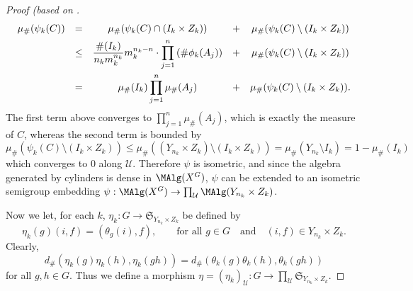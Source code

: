\begin{proof}[Proof (based on \cite{ozawasoficnotes}]
\[\begin{array}{rcccc}
\mu_\#(\psi_k(C))&=&\mu_\#(\psi_k(C)\cap(I_k\times Z_k))&+&\mu_\#(\psi_k(C)\setminus(I_k\times Z_k))\vspace{1ex}\\
&\leq&\displaystyle{\frac{\#(I_k)}{n_km_k^{n_k}}m_k^{n_k-n}\cdot\prod_{j=1}^n\left(\#\phi_k(A_j)\right)}&+&\displaystyle{\mu_\#(\psi_k(C)\setminus(I_k\times Z_k))}\vspace{1ex}\\
&=&\displaystyle{\mu_\#(I_k)\prod_{j=1}^n\mu_\#(A_j)}&+&\displaystyle{\mu_\#(\psi_k(C)\setminus(I_k\times Z_k)).}
\end{array}\]
The first term above converges to $\prod_{j=1}^n\mu_{\#}(A_j)$, which is exactly the measure of $C$, whereas the second term is bounded by
\[\mu_\#(\psi_k(C)\setminus(I_k\times Z_k))\leq\mu_\#((Y_{n_k}\times Z_k)\setminus(I_k\times Z_k))=\mu_\#(Y_{n_k}\setminus I_k)=1-\mu_\#(I_k)\]
which converges to $0$ along $\mathcal{U}$. Therefore $\psi$ is isometric, and since the algebra generated by cylinders is dense in $\MAlg(X^G)$, $\psi$ can be extended to an isometric semigroup embedding $\psi:\MAlg(X^G)\to\prod_{\mathcal{U}}\MAlg(Y_{n_k}\times Z_k)$.

Now we let, for each $k$, $\eta_k:G\to\mathfrak{S}_{Y_{n_k}\times Z_k}$ be defined by
\[\eta_k(g)(i,f)=(\theta_g(i),f),\qquad\text{for all }g\in G\quad\text{and}\quad(i,f)\in Y_{n_k}\times Z_k.\]
Clearly,
\[d_\#(\eta_k(g)\eta_k(h),\eta_k(gh))=d_{\#}(\theta_k(g)\theta_k(h),\theta_k(gh))\]
for all $g,h\in G$. Thus we define a morphism $\eta=(\eta_k)_\mathcal{U}:G\to\prod_\mathcal{U}\mathfrak{S}_{Y_{n_k}\times Z_k}$.


\end{proof}
